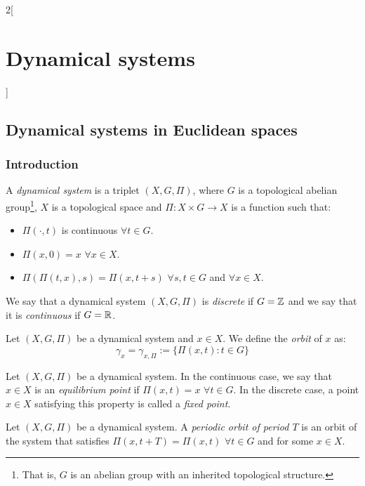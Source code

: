 \documentclass[../../../main_math.tex]{subfiles}
\begin{document}
\renewcommand{\col}{\apl}
\begin{multicols}{2}[\section{Dynamical systems}]
  \subsection{Dynamical systems in Euclidean spaces}
  \subsubsection{Introduction}
  \begin{definition}
    A \emph{dynamical system} is a triplet $(X,G,\Pi)$, where $G$ is a topological abelian group\footnote{That is, $G$ is an abelian group with an inherited topological structure.}, $X$ is a topological space and $\Pi:X\times G\rightarrow X$ is a function such that:
    \begin{itemize}
      \item $\Pi(\cdot,t)$ is continuous $\forall t\in G$.
      \item $\Pi(x,0)=x$ $\forall x\in X$.
      \item $\Pi(\Pi(t,x),s)=\Pi(x,t+s)$ $\forall s,t\in G$ and $\forall x\in X$.
    \end{itemize}
    We say that a dynamical system $(X,G,\Pi)$ is \emph{discrete} if $G=\mathbb{Z}$ and we say that it is \emph{continuous} if $G=\mathbb{R}$.
  \end{definition}
  \begin{definition}
    Let $(X,G,\Pi)$ be a dynamical system and $x\in X$. We define the \emph{orbit} of $x$ as: $$\gamma_x=\gamma_{x,\Pi}:=\{\Pi(x,t):t\in G\}$$
  \end{definition}
  \begin{definition}
    Let $(X,G,\Pi)$ be a dynamical system. In the continuous case, we say that $x\in X$ is an \emph{equilibrium point} if $\Pi(x,t)=x$ $\forall t\in G$. In the discrete case, a point $x\in X$ satisfying this property is called a \emph{fixed point}.
  \end{definition}
  \begin{definition}
    Let $(X,G,\Pi)$ be a dynamical system. A \emph{periodic orbit of period $T$} is an orbit of the system that satisfies $\Pi(x,t+T)=\Pi(x,t)$ $\forall t\in G$ and for some $x\in X$.
  \end{definition}
  \begin{lemma}

\end{lemma}
\end{multicols}
\end{document}
